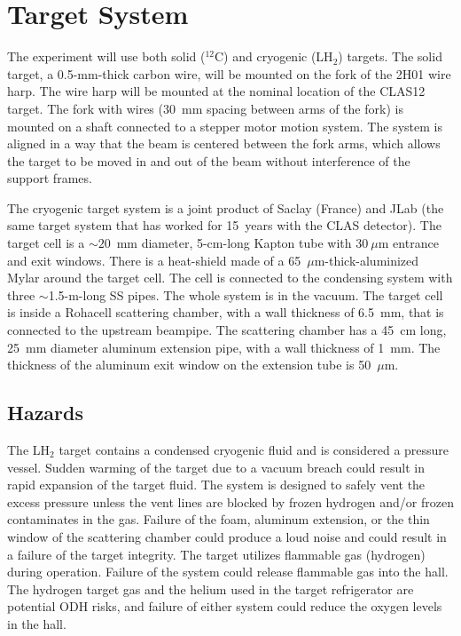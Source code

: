 \section{Target System}

The experiment will use both solid ($^{12}$C) and cryogenic (LH$_2$) targets. The solid 
target, a 0.5-mm-thick carbon wire, will be mounted on the fork of the 2H01 wire harp. The 
wire harp will be mounted at the nominal location of the CLAS12 target. The fork with wires 
(30~mm spacing between arms of the fork) is mounted on a shaft connected to a stepper 
motor motion system. The system is aligned in a way that the beam is centered between the 
fork arms, which allows the target to be moved in and out of the beam without interference 
of the support frames.
   
The cryogenic target system is a joint product of Saclay (France) and JLab (the same target 
system that has worked for 15~years with the CLAS detector). The target cell is a $\sim 20$~mm 
diameter, 5-cm-long Kapton tube with $30~\mu$m entrance and exit windows. There is a 
heat-shield made of a 65~$\mu$m-thick-aluminized Mylar around the target cell. The cell is 
connected to the condensing system with three $\sim$1.5-m-long SS pipes. The whole system is 
in the vacuum. The target cell is inside a Rohacell scattering chamber, with a wall thickness 
of 6.5~mm, that is connected to the upstream beampipe. The scattering chamber has a 45~cm long,
25~mm diameter aluminum extension pipe, with a wall thickness of 1~mm. The thickness of the 
aluminum exit window on the extension tube is 50~$\mu$m.
               
\subsection{Hazards} 

The LH$_2$ target contains a condensed cryogenic fluid and is considered a pressure vessel. 
Sudden warming of the target due to a vacuum breach could result in rapid expansion of the 
target fluid. The system is designed to safely vent the excess pressure unless the vent 
lines are blocked by frozen hydrogen and/or frozen contaminates in the gas. Failure of the 
foam, aluminum extension, or the thin window of the scattering chamber could produce a loud 
noise and could result in a failure of the target integrity. The target utilizes flammable 
gas (hydrogen) during operation. Failure of the system could release flammable gas into the 
hall. The hydrogen target gas and the helium used in the target refrigerator are potential 
ODH risks, and failure of either system could reduce the oxygen levels in the hall.


